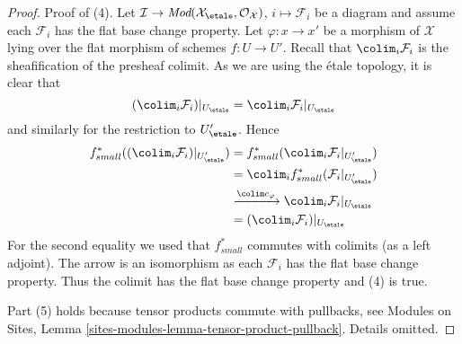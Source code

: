 \begin{proof}
\medskip\noindent
Proof of (4). Let $\mathcal{I} \to
\textit{Mod}(\mathcal{X}_\etale, \mathcal{O}_\mathcal{X})$,
$i \mapsto \mathcal{F}_i$ be a diagram and assume each $\mathcal{F}_i$
has the flat base change property. Let $\varphi : x \to x'$ be a morphism
of $\mathcal{X}$ lying over the flat morphism of schemes $f : U \to U'$.
Recall that $\colim_i \mathcal{F}_i$ is the sheafification of the presheaf
colimit. As we are using the \'etale topology, it is clear that
$$
(\colim_i \mathcal{F}_i)|_{U_\etale} =
\colim_i {\mathcal{F}_i}|_{U_\etale}
$$
and similarly for the restriction to $U'_\etale$. Hence
\begin{align*}
f_{small}^*((\colim_i \mathcal{F}_i)|_{U'_\etale})
& =
f_{small}^*(\colim_i {\mathcal{F}_i}|_{U'_\etale}) \\
& =
\colim_i f_{small}^*({\mathcal{F}_i}|_{U'_\etale}) \\
& \xrightarrow{\colim c_\varphi}
\colim_i \mathcal{F}_i|_{U_\etale} \\
& =
(\colim_i \mathcal{F}_i)|_{U_\etale}
\end{align*}
For the second equality we used that $f_{small}^*$ commutes with colimits
(as a left adjoint). The arrow is an isomorphism as each
$\mathcal{F}_i$ has the flat base change property. Thus the colimit
has the flat base change property and (4) is true.

\medskip\noindent
Part (5) holds because tensor products commute with pullbacks, see
Modules on Sites, Lemma \ref{sites-modules-lemma-tensor-product-pullback}.
Details omitted.


\end{proof}
